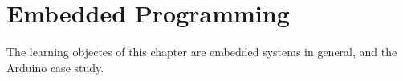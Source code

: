 \chapter{Embedded Programming}
The learning objectes of this chapter are embedded systems in general, and the Arduino case study.
